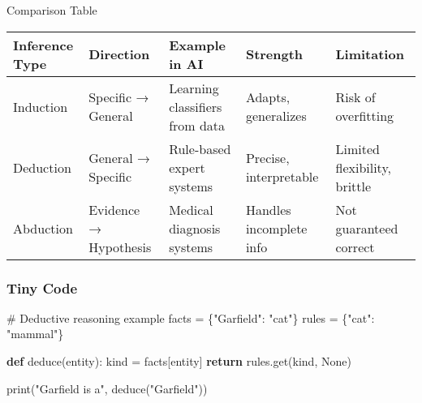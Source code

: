\documentclass[
  letterpaper,
  DIV=11,
  numbers=noendperiod]{scrreprt}
\newenvironment{Shaded}{\begin{snugshade}}{\end{snugshade}}
\newcommand{\BuiltInTok}[1]{\textcolor[rgb]{0.00,0.23,0.31}{#1}}
\newcommand{\CommentTok}[1]{\textcolor[rgb]{0.37,0.37,0.37}{#1}}
\newcommand{\ControlFlowTok}[1]{\textcolor[rgb]{0.00,0.23,0.31}{\textbf{#1}}}
\newcommand{\KeywordTok}[1]{\textcolor[rgb]{0.00,0.23,0.31}{\textbf{#1}}}
\newcommand{\NormalTok}[1]{\textcolor[rgb]{0.00,0.23,0.31}{#1}}
\newcommand{\OperatorTok}[1]{\textcolor[rgb]{0.37,0.37,0.37}{#1}}
\newcommand{\StringTok}[1]{\textcolor[rgb]{0.13,0.47,0.30}{#1}}
\newcommand{\VariableTok}[1]{\textcolor[rgb]{0.07,0.07,0.07}{#1}}
\begin{document}
Comparison Table

\begin{longtable}[]{@{}
  >{\raggedright\arraybackslash}p{}
  >{\raggedright\arraybackslash}p{}
  >{\raggedright\arraybackslash}p{}
  >{\raggedright\arraybackslash}p{}
  >{\raggedright\arraybackslash}p{}@{}}
\toprule\noalign{}
\begin{minipage}[b]{\linewidth}\raggedright
Inference Type
\end{minipage} & \begin{minipage}[b]{\linewidth}\raggedright
Direction
\end{minipage} & \begin{minipage}[b]{\linewidth}\raggedright
Example in AI
\end{minipage} & \begin{minipage}[b]{\linewidth}\raggedright
Strength
\end{minipage} & \begin{minipage}[b]{\linewidth}\raggedright
Limitation
\end{minipage} \\
\midrule\noalign{}
\endhead
\bottomrule\noalign{}
\endlastfoot
Induction & Specific → General & Learning classifiers from data &
Adapts, generalizes & Risk of overfitting \\
Deduction & General → Specific & Rule-based expert systems & Precise,
interpretable & Limited flexibility, brittle \\
Abduction & Evidence → Hypothesis & Medical diagnosis systems & Handles
incomplete info & Not guaranteed correct \\
\end{longtable}

\subsubsection{Tiny Code}\label{tiny-code-51}

\begin{Shaded}
\begin{Highlighting}[]
\CommentTok{\# Deductive reasoning example}
\NormalTok{facts }\OperatorTok{=}\NormalTok{ \{}\StringTok{"Garfield"}\NormalTok{: }\StringTok{"cat"}\NormalTok{\}}
\NormalTok{rules }\OperatorTok{=}\NormalTok{ \{}\StringTok{"cat"}\NormalTok{: }\StringTok{"mammal"}\NormalTok{\}}

\KeywordTok{def}\NormalTok{ deduce(entity):}
\NormalTok{    kind }\OperatorTok{=}\NormalTok{ facts[entity]}
    \ControlFlowTok{return}\NormalTok{ rules.get(kind, }\VariableTok{None}\NormalTok{)}

\BuiltInTok{print}\NormalTok{(}\StringTok{"Garfield is a"}\NormalTok{, deduce(}\StringTok{"Garfield"}\NormalTok{))}
\end{Highlighting}
\end{Shaded}
\end{document}
